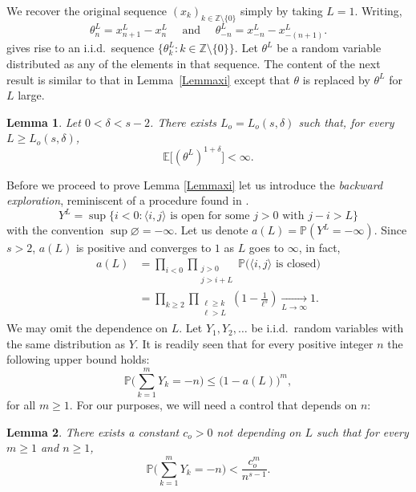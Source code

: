 \documentclass[a4paper,oneside,12pt]{amsart}
\renewcommand{\leq}{\leqslant}
\renewcommand{\geq}{\geqslant}
\newcommand{\E}{\mathbb{E}}
\theoremstyle{plain}
\newtheorem{lemma}{Lemma}
\theoremstyle{definition}
\theoremstyle{remark}
\renewcommand{\P}{\mathbb{P}}
\begin{document}
We recover the original sequence $(x_k)_{k\in \mathbb{Z} \setminus \{0\}}$ simply by taking $L=1$.
Writing,
\begin{equation*}
\theta_n^L = x_{n+1}^L - x_{n}^L \quad \textrm{ and } \quad \theta_{-n}^L = x_{-n}^L - x_{-(n+1)}^L.
\end{equation*} 
gives rise to an i.i.d.\ sequence $\{ \theta_k^L \colon k \in \mathbb{Z} \setminus \{0\}\}$. 
 Let ${\theta^L}$ be a random variable distributed as any of the elements in that sequence.
 The content of the next result is similar to that in Lemma~\ref{Lemmaxi} except that $\theta$ is replaced by ${\theta^L}$ for $L$ large.

\begin{lemma}\label{LemmaXiL} 
Let $0 < \delta < s-2$.
There exists $L_o = L_o(s,\delta)$ such that, for every $L \geq L_o(s,\delta)$,
\begin{equation*}
\E\Big[{(\theta^L)}^{1+\delta}\Big] < \infty.
\end{equation*}
\end{lemma}

Before we proceed to prove Lemma \ref{Lemmaxi} let us introduce the \textit{backward exploration}, reminiscent of a procedure found in \cite[Section 2]{GGNR}.
\begin{equation*}
Y^L = \sup \big\{ i < 0 \colon \text{$\langle i,j\rangle$ is open for some $j > 0$ with $j-i > L$} \big\}
\end{equation*}
with the convention $\sup \varnothing = -\infty$.
Let us denote $a(L)=\P(Y^L = -\infty)$.
Since $s > 2$, $a(L)$ is positive and converges to $1$ as $L$ goes to $\infty$, in fact,
\begin{equation}
\label{eq:aL}
\begin{split}
a(L) & = \prod_{i < 0} \prod_{\substack{j > 0 \\ j > i+L } } \P\big(\text{$\langle i,j \rangle$ is closed}\big)\\
& = \prod_{k \geq 2}\prod_{\substack{\ell \geq k \\ \ell > L }} \left(1 - \frac{1}{\ell^s} \right)    \underset{L \to \infty}{\longrightarrow} 1.
\end{split}
\end{equation}
We may omit the dependence on $L$.
Let $Y_1, Y_2, \dots$ be i.i.d.\ random variables with the same distribution as $Y$.
It is readily seen that for every positive integer $n$  the following upper bound holds:
\begin{equation*}
\P \bigg( \sum_{k=1}^m Y_k = -n \bigg) \leq \big(1-a(L)\big)^m,
\end{equation*}
for all $m\geq 1$.
For our purposes, we will need a control that depends on $n$:
\begin{lemma}
\label{l:hit_z}
There exists a constant $c_o>0$ not depending on $L$ such that for every $m \geq 1$ and $n \geq 1$,
\begin{equation}
\label{eq:hit_z}
\P\bigg( \sum_{k=1}^m Y_k = -n  \bigg) <  \frac{c_o^m}{n^{s-1}}.
\end{equation}
\end{lemma}
\end{document}
